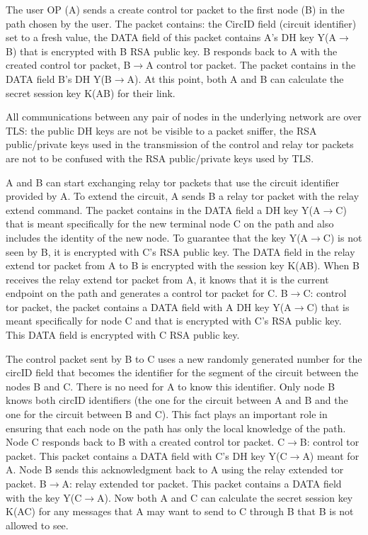 The user OP (A) sends a create control tor packet to the first node (B) in the path chosen by the user. The packet contains: the CircID field (circuit identifier) set to a fresh value, the DATA field of this packet contains A's DH key Y(A$\rightarrow$B) that is encrypted with B RSA public key.
B responds back to A with the created control tor packet, B$\rightarrow$A control tor packet. The packet contains in the DATA field B's DH Y(B$\rightarrow$A). At this point, both A and B can calculate the secret session key K(AB) for their link.

All communications between any pair of nodes in the underlying network are over TLS: the public DH keys are not be visible to a packet sniffer, the RSA public/private keys used in the transmission of the control and relay tor packets are not to be confused with the RSA public/private keys used by TLS.

A and B can start exchanging relay tor packets that use the circuit identifier provided by A.  To extend the circuit, A sends B a relay tor packet with the relay extend command. The packet contains in the DATA field a DH key Y(A$\rightarrow$C) that is meant specifically for the new terminal node C on the path and also includes the identity of the new node. To guarantee that the key Y(A$\rightarrow$C) is not seen by B, it is encrypted with C's RSA public key. The DATA field in the relay extend tor packet from A to B is encrypted with the session key K(AB). When B receives the relay extend tor packet from A, it knows that it is the current endpoint on the path and generates a control tor packet for C.  B$\rightarrow$C: control tor packet, the packet contains a DATA field with A DH key Y(A$\rightarrow$C) that is meant specifically for node C and that is encrypted with C's RSA public key. This DATA field is encrypted with C RSA public key.

The control packet sent by B to C uses a new randomly generated number for the circID field that becomes the identifier for the segment of the circuit between the nodes B and C. There is no need for A to know this identifier. Only node B knows both circID identifiers (the one for the circuit between A and B and the one for the circuit between B and C). This fact plays an important role in ensuring that each node on the path has only the local knowledge of the path.
Node C responds back to B with a created control tor packet. C$\rightarrow$B: control tor packet. This packet contains a DATA field with C's DH key Y(C$\rightarrow$A) meant for A. Node B sends this acknowledgment back to A using the relay extended tor packet. B$\rightarrow$A: relay extended tor packet. This packet contains a DATA field with the key Y(C$\rightarrow$A). Now both A and C can calculate the secret session key K(AC) for any messages that A may want to send to C through B that B is not allowed to see.


